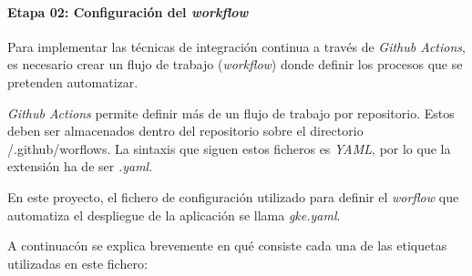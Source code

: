 
\paragraph{Etapa 02: Configuración del \emph{workflow}}

Para implementar las técnicas de integración continua a través de
\emph{Github Actions}, es necesario crear un flujo de trabajo
(\emph{workflow}) donde definir los procesos que se pretenden
automatizar.

\emph{Github Actions} permite definir más de un flujo de trabajo por
repositorio. Estos deben ser almacenados dentro del repositorio sobre el
directorio {/.github/worflows}. La sintaxis que siguen estos ficheros es
\emph{YAML}, por lo que la extensión ha de ser \emph{.yaml}.

En este proyecto, el fichero de configuración utilizado para definir el
\emph{worflow} que automatiza el despliegue de la aplicación se llama
\emph{gke.yaml}.

A continuacón se explica brevemente en qué consiste cada una de las
etiquetas utilizadas en este fichero:

